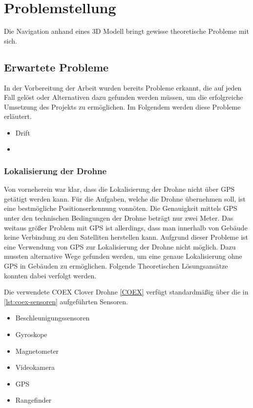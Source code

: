 \chapter{Problemstellung}

Die Navigation anhand eines 3D Modell bringt gewisse theoretische Probleme mit sich.





\section{Erwartete Probleme}

In der Vorbereitung der Arbeit wurden bereits Probleme erkannt, die auf jeden Fall gelöst oder Alternativen dazu gefunden werden müssen, um die erfolgreiche Umsetzung des Projekts zu ermöglichen. Im Folgendem werden diese Probleme erläutert.

\begin{itemize}
    \item{Drift}
    \item 
\end{itemize}

\subsection{Lokalisierung der Drohne}

Von vorneherein war klar, dass die Lokalisierung der Drohne nicht über \ac{GPS} getätigt werden kann. Für die Aufgaben, welche die Drohne übernehmen soll, ist eine bestmögliche Positionserkennung vonnöten. Die Genauigkeit mittels \ac{GPS} unter den technischen Bedingungen der Drohne beträgt nur zwei Meter. Das weitaus größer Problem mit \ac{GPS} ist allerdings, dass man innerhalb von Gebäude keine Verbindung zu den Satelliten herstellen kann. Aufgrund dieser Probleme ist eine Verwendung von \ac{GPS} zur Lokalisierung der Drohne nicht möglich. Dazu mussten alternative Wege gefunden werden, um eine genaue Lokalisierung ohne \ac{GPS} in Gebäuden zu ermöglichen. Folgende Theoretischen Lösungsansätze konnten dabei verfolgt werden.

Die verwendete COEX Clover Drohne \ref{COEX} verfügt standardmäßig über die in \ref{lst:coex-sensoren} aufgeführten Sensoren.

\begin{center}
\begin{itemize}
    \item Beschleunigungssensoren 
    \item Gyroskope
    \item Magnetometer
    \item Videokamera
    \item GPS
    \item Rangefinder
\end{itemize}
\label{lst:coex-sensoren}
\end{center}

